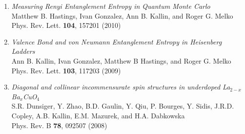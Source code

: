 \documentclass[letterpaper]{article}
\begin{document}
\begin{enumerate}
\item  {\it Measuring Renyi Entanglement Entropy in Quantum Monte Carlo}\\%
Matthew B. Hastings, Ivan Gonzalez, Ann B. Kallin, and Roger G. Melko \\
Phys. Rev. Lett. {\bf 104}, 157201 (2010) 

\item  {\it Valence Bond and von Neumann Entanglement Entropy in Heisenberg Ladders} \\%
Ann B. Kallin, Ivan Gonzalez, Matthew B Hastings, and Roger G. Melko\\
Phys. Rev. Lett. {\bf 103}, 117203 (2009)

\item {\it Diagonal and collinear incommensurate spin structures in underdoped La$_{2-x}$Ba$_x$CuO$_4$} \\%
    S.R. Dunsiger, Y. Zhao, B.D. Gaulin, Y. Qiu, P. Bourges, Y. Sidis, J.R.D. Copley,  
  A.B. Kallin, E.M. Mazurek, and H.A. Dabkowska \\
Phys. Rev. B {\bf 78}, 092507 (2008) 
\end{enumerate}

\vspace{70pt}
\end{document}
